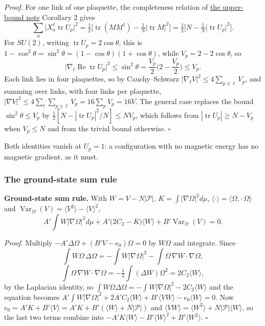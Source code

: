 \documentclass[11pt,a4paper]{article}
\begin{document}
\emph{Proof.} For one link of one plaquette, the completeness relation
of \href{lattice-gap-upper-bounds.md}{the upper-bound note} Corollary 2
gives \[\sum_a\big|X^\ell_a\operatorname{tr}U_p\big|^2
=\tfrac12\Big[\operatorname{tr}(MM^\dagger)-\tfrac1N\big|\operatorname{tr}M\big|^2\Big]
=\tfrac12\Big[N-\tfrac1N\big|\operatorname{tr}U_p\big|^2\Big].\] For
\(SU(2)\), writing \(\operatorname{tr}U_p=2\cos\theta\), this is
\(1-\cos^2\theta=\sin^2\theta=(1-\cos\theta)(1+\cos\theta)\), while
\(V_p=2-2\cos\theta\), so
\[\big|\nabla_\ell\operatorname{Re}\operatorname{tr}U_p\big|^2
\le\sin^2\theta=\frac{V_p}2\Big(2-\frac{V_p}2\Big)\le V_p .\] Each link
lies in four plaquettes, so by Cauchy--Schwarz
\(|\nabla_\ell V|^2\le4\sum_{p\ni\ell}V_p\), and summing over links,
with four links per plaquette,
\(|\nabla V|^2\le4\sum_\ell\sum_{p\ni\ell}V_p=16\sum_pV_p=16V\). The
general case replaces the bound \(\sin^2\theta\le V_p\) by
\(\tfrac12[N-|\operatorname{tr}U_p|^2/N]\le NV_p\), which follows from
\(|\operatorname{tr}U_p|\ge N-V_p\) when \(V_p\le N\) and from the
trivial bound otherwise. \(\square\)

Both identities vanish at \(U_p=1\): a configuration with no magnetic
energy has no magnetic gradient, as it must.

\hypertarget{the-ground-state-sum-rule}{%
\subsubsection{The ground-state sum
rule}\label{the-ground-state-sum-rule}}

\textbf{Ground-state sum rule.} With \(W=V-N|\mathcal P|\),
\(K=\int|\nabla\Omega|^2d\mu\),
\(\langle\cdot\rangle=\langle\Omega,\cdot\,\Omega\rangle\) and
\(\operatorname{Var}_\Omega(V)=\langle V^2\rangle-\langle V\rangle^2\),
\[A'\!\int W\big|\nabla\Omega\big|^2d\mu
+A'\big(2C_2-K\big)\langle W\rangle
+B'\operatorname{Var}_\Omega(V)=0 .\]

\emph{Proof.} Multiply \(-A'\Delta\Omega+(B'V-e_0)\Omega=0\) by
\(W\Omega\) and integrate. Since
\[\int W\Omega\,\Delta\Omega=-\int W|\nabla\Omega|^2-\int\Omega\,\nabla W\!\cdot\!\nabla\Omega,\]
\[\int\Omega\,\nabla W\!\cdot\!\nabla\Omega=-\tfrac12\int(\Delta W)\Omega^2=2C_2\langle W\rangle,\]
by the Laplacian identity, so
\(\int W\Omega\Delta\Omega=-\int W|\nabla\Omega|^2-2C_2\langle W\rangle\)
and the equation becomes
\(A'\int W|\nabla\Omega|^2+2A'C_2\langle W\rangle+B'\langle VW\rangle-e_0\langle W\rangle=0\).
Now
\(e_0=A'K+B'\langle V\rangle=A'K+B'(\langle W\rangle+N|\mathcal P|)\)
and
\(\langle VW\rangle=\langle W^2\rangle+N|\mathcal P|\langle W\rangle\),
so the last two terms combine into
\(-A'K\langle W\rangle-B'\langle W\rangle^2+B'\langle W^2\rangle\).
\(\square\)
\end{document}
